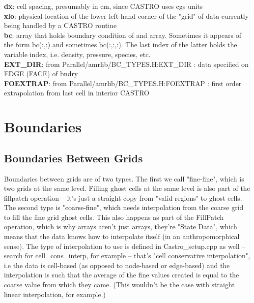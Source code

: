 {\bf dx}: cell spacing, presumably in cm, since CASTRO uses cgs units\\

{\bf xlo}: physical location of the lower left-hand corner of the "grid" of data currently being handled by a CASTRO routine\\

{\bf bc}: array that holds boundary condition of and array. Sometimes it appears of the form bc(:,:) and sometimes bc(:,:,:). The last index of the latter holds the variable index, i.e. density, pressure, species, etc.\\

{\bf EXT\_DIR}: from Parallel/amrlib/BC\_TYPES.H:EXT\_DIR  : data specified on EDGE (FACE) of bndry\\

{\bf FOEXTRAP}: from Parallel/amrlib/BC\_TYPES.H:FOEXTRAP  : first order extrapolation from last cell in interior CASTRO 

\section{Boundaries}
\subsection{Boundaries Between Grids}
Boundaries between grids are of two types. The first we call "fine-fine", which is two grids at the same level. 
Filling ghost cells at the same level is also part of the fillpatch operation -- it's just a straight copy from "valid regions" 
to ghost cells. The second type is "coarse-fine", which needs interpolation from the coarse grid to fill the fine grid ghost cells. 
This also happens as part of the FillPatch operation, which is why arrays aren't just arrays, they're "State Data", 
which means that the data knows how to interpolate itself (in an anthropomorphical sense). 
The type of interpolation to use is defined in Castro\_setup.cpp as well -- search for cell\_cons\_interp, for example -- 
that's "cell conservative interpolation", i.e the data is cell-based (as opposed to node-based or edge-based) and the 
interpolation is such that the average of the fine values created is equal to the coarse value from which they came. 
(This wouldn't be the case with straight linear interpolation, for example.) 

